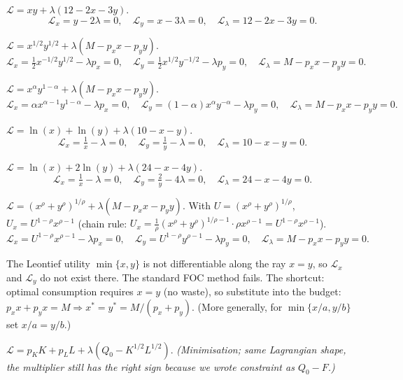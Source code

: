 \begin{solutions}
  \item $\mathcal{L} = x y + \lambda(12 - 2 x - 3 y)$.
  \[
  \mathcal{L}_x = y - 2 \lambda = 0, \quad \mathcal{L}_y = x - 3 \lambda = 0, \quad \mathcal{L}_\lambda = 12 - 2 x - 3 y = 0.
  \]
  \item $\mathcal{L} = x^{1/2} y^{1/2} + \lambda(M - p_x x - p_y y)$.
  \[
  \mathcal{L}_x = \tfrac{1}{2} x^{-1/2} y^{1/2} - \lambda p_x = 0, \quad \mathcal{L}_y = \tfrac{1}{2} x^{1/2} y^{-1/2} - \lambda p_y = 0, \quad \mathcal{L}_\lambda = M - p_x x - p_y y = 0.
  \]
  \item $\mathcal{L} = x^\alpha y^{1 - \alpha} + \lambda(M - p_x x - p_y y)$.
  \[
  \mathcal{L}_x = \alpha x^{\alpha - 1} y^{1 - \alpha} - \lambda p_x = 0, \quad \mathcal{L}_y = (1 - \alpha) x^\alpha y^{-\alpha} - \lambda p_y = 0, \quad \mathcal{L}_\lambda = M - p_x x - p_y y = 0.
  \]
  \item $\mathcal{L} = \ln(x) + \ln(y) + \lambda(10 - x - y)$.
  \[
  \mathcal{L}_x = \tfrac{1}{x} - \lambda = 0, \quad \mathcal{L}_y = \tfrac{1}{y} - \lambda = 0, \quad \mathcal{L}_\lambda = 10 - x - y = 0.
  \]
  \item $\mathcal{L} = \ln(x) + 2 \ln(y) + \lambda(24 - x - 4 y)$.
  \[
  \mathcal{L}_x = \tfrac{1}{x} - \lambda = 0, \quad \mathcal{L}_y = \tfrac{2}{y} - 4 \lambda = 0, \quad \mathcal{L}_\lambda = 24 - x - 4 y = 0.
  \]
  \item $\mathcal{L} = (x^\rho + y^\rho)^{1/\rho} + \lambda(M - p_x x - p_y y)$. With $U = (x^\rho + y^\rho)^{1/\rho}$, $U_x = U^{1 - \rho} x^{\rho - 1}$ (chain rule: $U_x = \tfrac{1}{\rho}(x^\rho + y^\rho)^{1/\rho - 1} \cdot \rho x^{\rho - 1} = U^{1 - \rho} x^{\rho - 1}$).
  \[
  \mathcal{L}_x = U^{1 - \rho} x^{\rho - 1} - \lambda p_x = 0, \quad \mathcal{L}_y = U^{1 - \rho} y^{\rho - 1} - \lambda p_y = 0, \quad \mathcal{L}_\lambda = M - p_x x - p_y y = 0.
  \]
  \item The Leontief utility $\min\{x, y\}$ is not differentiable along the ray $x = y$, so $\mathcal{L}_x$ and $\mathcal{L}_y$ do not exist there. The standard FOC method fails. The shortcut: optimal consumption requires $x = y$ (no waste), so substitute into the budget: $p_x x + p_y x = M \Rightarrow x^* = y^* = M/(p_x + p_y)$. (More generally, for $\min\{x/a, y/b\}$ set $x/a = y/b$.)
  \item $\mathcal{L} = p_K K + p_L L + \lambda(Q_0 - K^{1/2} L^{1/2})$. \emph{(Minimisation; same Lagrangian shape, the multiplier still has the right sign because we wrote constraint as $Q_0 - F$.)}

\end{solutions}
